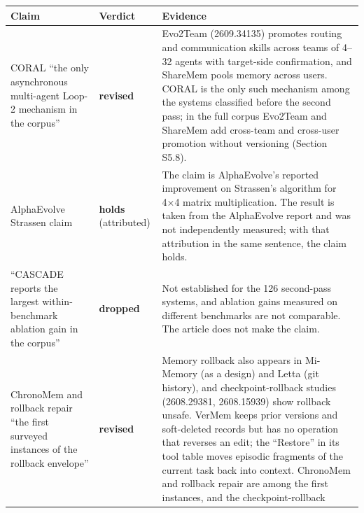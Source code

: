 \documentclass[
]{article}
\newcounter{none} %
\begin{document}
{\def\LTcaptype{none} %
\begin{longtable}[]{@{}
  >{\raggedright\arraybackslash}p{}
  >{\raggedright\arraybackslash}p{}
  >{\raggedright\arraybackslash}p{}@{}}
\toprule\noalign{}
\begin{minipage}[b]{\linewidth}\raggedright
Claim
\end{minipage} & \begin{minipage}[b]{\linewidth}\raggedright
Verdict
\end{minipage} & \begin{minipage}[b]{\linewidth}\raggedright
Evidence
\end{minipage} \\
\midrule\noalign{}
\endhead
\bottomrule\noalign{}
\endlastfoot
CORAL ``the only asynchronous multi-agent Loop-2 mechanism in the
corpus'' & \textbf{revised} & Evo2Team (2609.34135) promotes routing and
communication skills across teams of 4--32 agents with target-side
confirmation, and ShareMem pools memory across users. CORAL is the only
such mechanism among the systems classified before the second pass; in
the full corpus Evo2Team and ShareMem add cross-team and cross-user
promotion without versioning (Section S5.8). \\
AlphaEvolve Strassen claim & \textbf{holds} (attributed) & The claim is
AlphaEvolve's reported improvement on Strassen's algorithm for 4×4
matrix multiplication. The result is taken from the AlphaEvolve report
and was not independently measured; with that attribution in the same
sentence, the claim holds. \\
``CASCADE reports the largest within-benchmark ablation gain in the
corpus'' & \textbf{dropped} & Not established for the 126 second-pass
systems, and ablation gains measured on different benchmarks are not
comparable. The article does not make the claim. \\
ChronoMem and rollback repair ``the first surveyed instances of the
rollback envelope'' & \textbf{revised} & Memory rollback also appears in
Mi-Memory (as a design) and Letta (git history), and checkpoint-rollback
studies (2608.29381, 2608.15939) show rollback unsafe. VerMem keeps
prior versions and soft-deleted records but has no operation that
reverses an edit; the ``Restore'' in its tool table moves episodic
fragments of the current task back into context. ChronoMem and rollback
repair are among the first instances, and the checkpoint-rollback

\end{longtable}}
\end{document}
